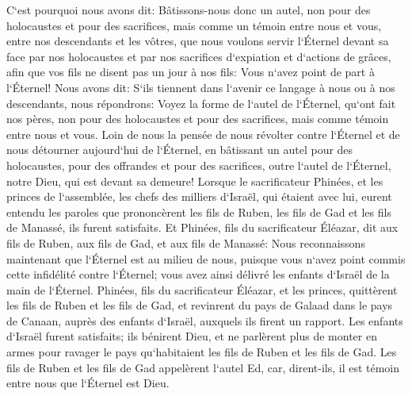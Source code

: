 \verse C`est pourquoi nous avons dit: Bâtissons-nous donc un autel, non pour des holocaustes et pour des sacrifices, 
\verse mais comme un témoin entre nous et vous, entre nos descendants et les vôtres, que nous voulons servir l`Éternel devant sa face par nos holocaustes et par nos sacrifices d`expiation et d`actions de grâces, afin que vos fils ne disent pas un jour à nos fils: Vous n`avez point de part à l`Éternel! 
\verse Nous avons dit: S`ils tiennent dans l`avenir ce langage à nous ou à nos descendants, nous répondrons: Voyez la forme de l`autel de l`Éternel, qu`ont fait nos pères, non pour des holocaustes et pour des sacrifices, mais comme témoin entre nous et vous. 
\verse Loin de nous la pensée de nous révolter contre l`Éternel et de nous détourner aujourd`hui de l`Éternel, en bâtissant un autel pour des holocaustes, pour des offrandes et pour des sacrifices, outre l`autel de l`Éternel, notre Dieu, qui est devant sa demeure! 
\verse Lorsque le sacrificateur Phinées, et les princes de l`assemblée, les chefs des milliers d`Israël, qui étaient avec lui, eurent entendu les paroles que prononcèrent les fils de Ruben, les fils de Gad et les fils de Manassé, ils furent satisfaits. 
\verse Et Phinées, fils du sacrificateur Éléazar, dit aux fils de Ruben, aux fils de Gad, et aux fils de Manassé: Nous reconnaissons maintenant que l`Éternel est au milieu de nous, puisque vous n`avez point commis cette infidélité contre l`Éternel; vous avez ainsi délivré les enfants d`Israël de la main de l`Éternel. 
\verse Phinées, fils du sacrificateur Éléazar, et les princes, quittèrent les fils de Ruben et les fils de Gad, et revinrent du pays de Galaad dans le pays de Canaan, auprès des enfants d`Israël, auxquels ils firent un rapport. 
\verse Les enfants d`Israël furent satisfaits; ils bénirent Dieu, et ne parlèrent plus de monter en armes pour ravager le pays qu`habitaient les fils de Ruben et les fils de Gad. 
\verse Les fils de Ruben et les fils de Gad appelèrent l`autel Ed, car, dirent-ils, il est témoin entre nous que l`Éternel est Dieu. 

